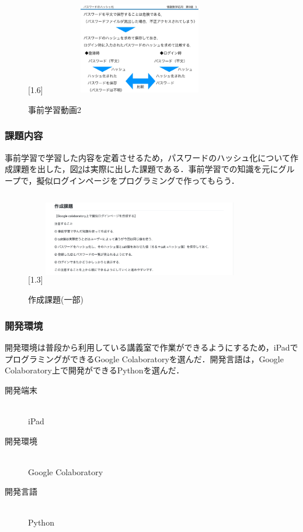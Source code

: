 \documentclass[a4j,11pt]{jsarticle}
\begin{document}
\begin{figure}[h]
\begin{center}
\scalebox{1}[1.6]{
 \includegraphics[clip,width=85mm,height=40mm]{hashv1.pdf}
 }
\end{center}
 \caption{事前学習動画2}
 \label{hash-v2}
\end{figure}


\newpage


\subsubsection{課題内容}
事前学習で学習した内容を定着させるため，パスワードのハッシュ化について作成課題を出した，図\ref{kadai1}は実際に出した課題である．事前学習での知識を元にグループで，擬似ログインページをプログラミングで作ってもらう．

\begin{figure}[h]
\begin{center}
\scalebox{1.5}[1.3]{
 \includegraphics[clip,width=85mm,height=40mm]{kadai1.pdf}
 }
\end{center}
 \caption{作成課題(一部)}
 \label{kadai1}
\end{figure}


\subsubsection{開発環境}
開発環境は普段から利用している講義室で作業ができるようにするため，iPadでプログラミングができるGoogle Colaboratoryを選んだ．開発言語は，Google Colaboratory上で開発ができるPythonを選んだ．

\begin{description}
\item[開発端末]\mbox{}\\iPad
\item[開発環境]\mbox{}\\Google Colaboratory
\item[開発言語]\mbox{}\\Python
\end{description}
\end{document}
